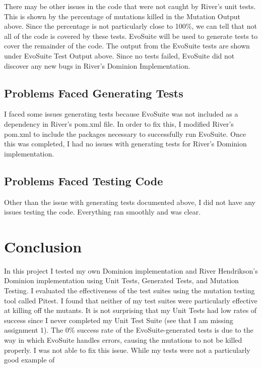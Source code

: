 \documentclass[letterpaper,10pt]{article}
\begin{document}
		There may be other issues in the code that were not caught by River's unit tests. 
		This is shown by the percentage of mutations killed in the Mutation Output above. 
		Since the percentage is not particularly close to 100\%, we can tell that not all 
		of the code is covered by these tests. EvoSuite will be used to generate tests 
		to cover the remainder of the code. The output from the EvoSuite tests are shown 
		under EvoSuite Test Output above. Since no tests failed, EvoSuite did not 
		discover any new bugs in River's Dominion Implementation.
	\subsection{Problems Faced Generating Tests}
	I faced some issues generating tests because EvoSuite was not included as a dependency in 
	 River's pom.xml file. In order to fix this, I modified River's pom.xml to include the 
	packages necessary to successfully run EvoSuite. Once this was completed, I had no issues 
	with generating tests for River's Dominion implementation.
	\subsection{Problems Faced Testing Code}
	Other than the issue with generating tests documented above, I did not have any issues 
	testing the code. Everything ran smoothly and was clear.

\section{Conclusion}
In this project I tested my own Dominion implementation and River Hendrikson's Dominion 
implementation using Unit Tests, Generated Tests, and Mutation Testing. I evaluated the 
effectiveness of the test suites using the mutation testing tool called Pitest. I found that 
neither of my test suites were particularly effective at killing off the mutants. It is not 
surprising that my Unit Tests had low rates of success since I never completed my Unit Test Suite 
(see that I am missing assignment 1). The 0\% success rate of the EvoSuite-generated tests is due 
to the way in which EvoSuite handles errors, causing the mutations to not be killed properly. I 
was not able to fix this issue. While my tests were not a particularly good example of 
\end{document}
